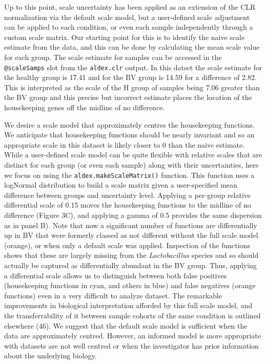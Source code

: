 \documentclass[
]{article}
\begin{document}
Up to this point, scale uncertainty has been applied as an extension of
the CLR normalization via the default scale model, but a user-defined
scale adjustment can be applied to each condition, or even each sample
independently through a custom scale matrix. Our starting point for this
is to identify the naive scale estimate from the data, and this can be
done by calculating the mean scale value for each group. The scale
estimate for samples can be accessed in the \texttt{@scaleSamps} slot
from the \texttt{aldex.clr} output. In this datset the scale estimate
for the healthy group is 17.41 and for the BV group is 14.59 for a
difference of 2.82. This is interpreted as the scale of the H group of
samples being 7.06 greater than the BV group and this precise but
incorrect estimate places the location of the housekeeping genes off the
midline of no difference.

We desire a scale model that approximately centres the housekeeping
functions. We anticipate that housekeeping functions should be nearly
invariant and so an appropriate scale in this dataset is likely closer
to 0 than the naive estimate. While a user-defined scale model can be
quite flexible with relative scales that are distinct for each group (or
even each sample) along with their uncertainties, here we focus on using
the \texttt{aldex.makeScaleMatrix()} function. This function uses a
logNormal distribution to build a scale matrix given a user-specified
mean difference between groups and uncertainty level. Applying a
per-group relative differential scale of 0.15 moves the housekeeping
functions to the midline of no difference (Figure 3C), and applying a
gamma of 0.5 provides the same dispersion as in panel B). Note that now
a significant number of functions are differentially up in BV that were
formerly classed as not different without the full scale model (orange),
or when only a default scale was applied. Inspection of the functions
shows that these are largely missing from the \emph{Lactobacillus}
species and so should actually be captured as differentially abundant in
the BV group. Thus, applying a differential scale allows us to
distinguish between both false positives (housekeeping functions in
cyan, and others in blue) and false negatives (orange functions) even in
a very difficult to analyze dataset. The remarkable improvements in
biological interpretation afforded by this full scale model, and the
transferrability of it between sample cohorts of the same condition is
outlined elsewhere (46). We suggest that the default scale model is
sufficient when the data are approximately centred. However, an informed
model is more appropriate with datasets are not well centred or when the
investigator has prior information about the underlying biology.
\end{document}
